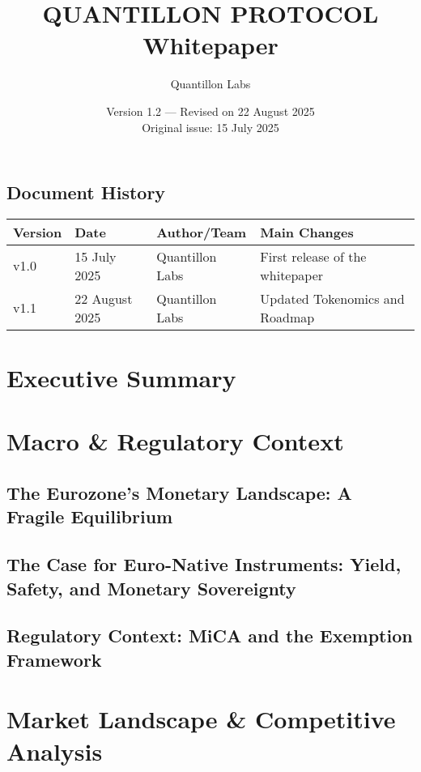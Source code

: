 \documentclass[12pt,a4paper]{report}
\title{\textbf{QUANTILLON PROTOCOL}\\Whitepaper}
\author{Quantillon Labs}
\date{Version 1.2 — Revised on 22 August 2025\\Original issue: 15 July 2025}
\begin{document}
\maketitle
\thispagestyle{empty}
\newpage

\section*{Document History}
\begin{longtable}{@{}llll@{}}
\toprule
\textbf{Version} & \textbf{Date} & \textbf{Author/Team} & \textbf{Main Changes} \\
\midrule
v1.0 & 15 July 2025 & Quantillon Labs & First release of the whitepaper \\
v1.1 & 22 August 2025 & Quantillon Labs & Updated Tokenomics and Roadmap \\
\bottomrule
\end{longtable}
\newpage

\tableofcontents
\newpage


\chapter{Executive Summary}

\chapter{Macro \& Regulatory Context}
\section{The Eurozone’s Monetary Landscape: A Fragile Equilibrium}
\section{The Case for Euro-Native Instruments: Yield, Safety, and Monetary Sovereignty}
\section{Regulatory Context: MiCA and the Exemption Framework}

\chapter{Market Landscape \& Competitive Analysis}
\end{document}
